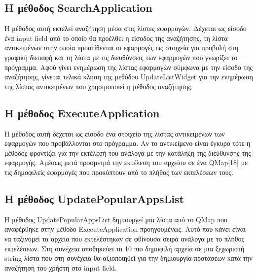 \subsection{Η μέθοδος SearchApplication}
Η μέθοδος αυτή εκτελεί αναζήτηση μέσα στις λίστες εφαρμογών. Δέχεται ως είσοδο ένα
input field από το οποίο θα προέλθει η είσοδος της αναζήτησης, τη λίστα αντικειμένων
στην οποία προστίθενται οι εφαρμογές ως στοιχεία για προβολή στη γραφική διεπαφή και
τη λίστα με τις διευθύνσεις των εφαρμογών που γνωρίζει το πρόγραμμα. Αφού γίνει ενημέρωση
της λίστας εφαρμογών σύμφωνα με την είσοδο της αναζήτησης, γίνεται τελικά κλήση της 
μεθόδου UpdateListWidget για την ενημέρωση της λίστας αντικειμένων που χρησιμοποιεί
η μέθοδος αναζήτησης. 


\subsection{Η μέθοδος ExecuteApplication}
Η μέθοδος αυτή δέχεται ως είσοδο ένα στοιχείο της λίστας αντικειμένων των εφαρμογών
που προβάλλονται στο πρόγραμμα. Αν το αντικείμενο είναι έγκυρο τότε η μέθοδος φροντίζει
για την εκτέλεσή του ανάλογα με την κατάληξη της διεύθυνσης της εφαρμογής. Αμέσως μετά
προσμετρά την εκτέλεση του αρχείου σε ένα QMap[18] με τις δημοφιλείς εφαρμογές που προκύπτουν
από το πλήθος των εκτελέσεων τους.


\subsection{Η μέθοδος UpdatePopularAppsList}
Η μέθοδος UpdatePopularAppsList δημιουργεί μια λίστα από το QMap που αναφέρθηκε στην
μέθοδο ExecuteApplication προηγουμένως. Αυτό που κάνει είναι να ταξινομεί τα αρχεία που
εκτελέστηκαν σε φθίνουσα σειρά ανάλογα με το πλήθος εκτελέσεων. Στη συνέχεια αποθηκεύει τα 10 πιο δημοφιλή αρχεία σε
μια ξεχωριστή string λίστα που στη συνέχεια θα αξιοποιηθεί για την δημιουργία προτάσεων
κατά την αναζήτηση του χρήστη στο input field.


